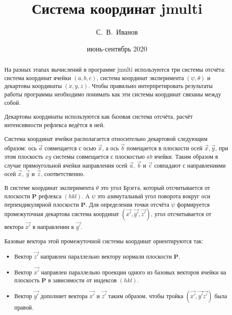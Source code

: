 \documentclass[12pt,a4paper,draft]{article}
\title{Система координат jmulti}
\author{С.~В.~Иванов}
\date{июнь-сентябрь 2020}
\begin{document}
\maketitle

\tableofcontents

\begin{abstract}
  На разных этапах вычислений в программе jmulti используются три системы
  отсчёта: система координат ячейки $(a, b, c)$,
  система координат эксперимента $(\psi, \theta)$ и декартовы координаты
  $(x, y, z)$. Чтобы правильно интерпретировать
  результаты работы программы необходимо понимать как эти системы координат
  связаны между собой.

  Декартовы координаты используются как базовая система отсчёта,
  расчёт интенсивности рефлекса ведётся в ней.

  Система координат ячейки располагается относительно декартовой следующим
  образом: ось $\vec{a}$ совмещается с осью $\vec{x}$,
  а ось $\vec{b}$ помещается в плоскости осей $\vec{x}, \vec{y}$, при этом
  плоскость $xy$ системы совмещается с плоскостью $ab$ ячейки. Таким образом в
  случае прямоугольной ячейки направления осей $\vec{a}$, $\vec{b}$
  и $\vec{c}$ совпадают с направлениями осей $\vec{x}$, $\vec{y}$ и
  $\vec{z}$, соответственно.

  В системе координат эксперимента $\theta$ это угол Брэгга, который
  отсчитывается от плоскости $\mathbf{P}$ рефлекса $(hkl)$. А $\psi$ это
  азимутальный угол поворота вокруг оси перпендикулярной плоскости $\mathbf{P}$.
  Для определения точки отсчёта $\psi$ формируется промежуточная декартова
  система координат $(\vec{x'}, \vec{y'}, \vec{z'})$,
  угол отсчитывается от вектора $\vec{x'}$ в направлении к $\vec{y'}$.
  
  Базовые вектора этой промежуточной системы координат ориентируются так:
  \begin{itemize}
    \item Вектор $\vec{z'}$ направлен параллельно
      вектору нормали плоскости $\mathbf{P}$.
    \item Вектор $\vec{x'}$ направлен параллельно проекции
      одного из базовых векторов ячейки на плоскость $\mathbf{P}$
      в зависимости от индексов $(hkl)$.
    \item Вектор $\vec{y'}$ дополняет вектора $\vec{x'}$ и $\vec{z'}$
      таким образом, чтобы тройка $(\vec{x'}, \vec{y'} \vec{z'})$
      была правой.
  \end{itemize}

\end{abstract}
\end{document}
